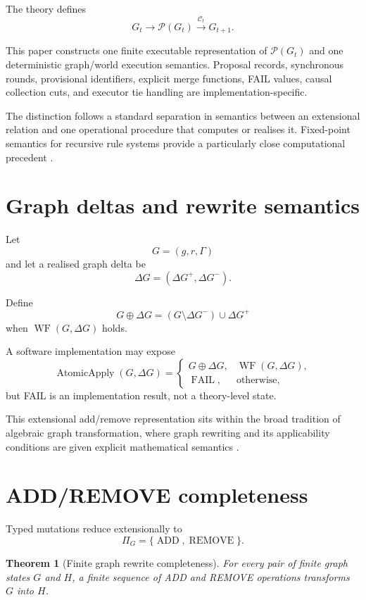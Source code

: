 \documentclass[11pt,a4paper]{article}
\newtheorem{theorem}{Theorem}[section]
\theoremstyle{remark}
\begin{document}
The theory defines
\[
G_t\rightarrow\mathcal P(G_t)\xrightarrow{\mathcal C_t}G_{t+1}.
\]

This paper constructs one finite executable representation of $\mathcal P(G_t)$ and one deterministic graph/world execution semantics. Proposal records, synchronous rounds, provisional identifiers, explicit merge functions, \textsc{FAIL} values, causal collection cuts, and executor tie handling are implementation-specific.

The distinction follows a standard separation in semantics between an extensional relation and one operational procedure that computes or realises it. Fixed-point semantics for recursive rule systems provide a particularly close computational precedent \citep{tarski1955,cousot1977,ceri1989}.

\section{Graph deltas and rewrite semantics}\label{sec:deltas}

Let
\[
G=(g,r,\Gamma)
\]
and let a realised graph delta be
\[
\Delta G=(\Delta G^+,\Delta G^-).
\]

Define
\[
G\oplus\Delta G
=
(G\setminus\Delta G^-)\cup\Delta G^+
\]
when $\operatorname{WF}(G,\Delta G)$ holds.

A software implementation may expose
\[
\operatorname{AtomicApply}(G,\Delta G)=
\begin{cases}
G\oplus\Delta G,&\operatorname{WF}(G,\Delta G),\\
\operatorname{FAIL},&\text{otherwise},
\end{cases}
\]
but \textsc{FAIL} is an implementation result, not a theory-level state.

This extensional add/remove representation sits within the broad tradition of algebraic graph transformation, where graph rewriting and its applicability conditions are given explicit mathematical semantics \citep{corradini1997,ehrig2006}.

\section{ADD/REMOVE completeness}\label{sec:add-remove}

Typed mutations reduce extensionally to
\[
\Pi_G=\{\operatorname{ADD},\operatorname{REMOVE}\}.
\]

\begin{theorem}[Finite graph rewrite completeness]\label{thm:add-remove}
For every pair of finite graph states $G$ and $H$, a finite sequence of ADD and REMOVE operations transforms $G$ into $H$.
\end{theorem}
\end{document}
